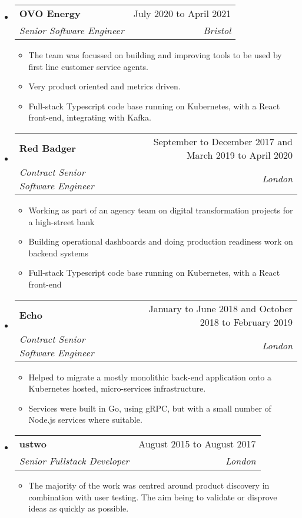 \documentclass[letterpaper,12pt]{article}[leftmargin=*]
\makeatletter
\def \entryspacing {-0pt}
\newenvironment{resumeEntry}[0]{
  \begin{itemize}[leftmargin=2.5mm]
  }{
  \end{itemize}\vspace{\entryspacing}
}
\newenvironment{resumeItemList}[0]{
  \begin{itemize}[leftmargin=4.5mm]
  }{
  \end{itemize}
}
\newcommand{\resumeItem}[1]{
  \item\small{
    {#1 \vspace{-2pt}}
  }
}
\newcommand{\resumeEntryTSDL}[4]{
  \vspace{-1pt}\item[]
    \begin{tabularx}{0.97\textwidth}{X@{\hspace{60pt}}r}
      \textbf{\color{primary}#1} & {\firabook\color{accent}\small#2} \\
      \textit{\color{accent}\small#3} & \textit{\color{accent}\small#4} \\
    \end{tabularx}\vspace{-6pt}
}
\makeatother
\begin{document}
  \begin{resumeEntry}
    \resumeEntryTSDL{OVO Energy}{July 2020 to April 2021}
      {Senior Software Engineer}{Bristol}
    \begin{resumeItemList}
      \resumeItem{The team was focussed on building and improving tools to be used by first line customer service agents.}
      \resumeItem{Very product oriented and metrics driven.}
      \resumeItem{Full-stack Typescript code base running on Kubernetes, with a React front-end, integrating with Kafka.}
    \end{resumeItemList}
  \end{resumeEntry}

  \begin{resumeEntry}
    \resumeEntryTSDL{Red Badger}{September to December 2017 and March 2019 to April 2020}
      {Contract Senior Software Engineer}{London}
    \begin{resumeItemList}
      \resumeItem{Working as part of an agency team on digital transformation projects for a high-street bank}
      \resumeItem{Building operational dashboards and doing production readiness work on backend systems}
      \resumeItem{Full-stack Typescript code base running on Kubernetes, with a React front-end}
    \end{resumeItemList}
  \end{resumeEntry}

  \begin{resumeEntry}
    \resumeEntryTSDL{Echo}{January to June 2018 and October 2018 to February 2019}
      {Contract Senior Software Engineer}{London}
    \begin{resumeItemList}
      \resumeItem{Helped to migrate a mostly monolithic back-end application onto a Kubernetes hosted, micro-services infrastructure.}
      \resumeItem{Services were built in Go, using gRPC, but with a small number of Node.js services where suitable.}
    \end{resumeItemList}
  \end{resumeEntry}

  \begin{resumeEntry}
    \resumeEntryTSDL{ustwo}{August 2015 to August 2017}{Senior Fullstack Developer}{London}
    \begin{resumeItemList}
      \resumeItem{The majority of the work was centred around product discovery in combination with user testing. The aim being to validate or disprove ideas as quickly as possible.}
    \end{resumeItemList}
  \end{resumeEntry}
\end{document}
